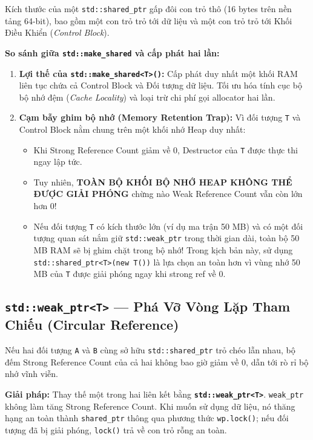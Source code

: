 \documentclass[12pt,a4paper,oneside]{book}
\begin{document}
\begin{underhoodbox}
Kích thước của một \texttt{std::shared\_ptr} gấp đôi con trỏ thô (16 bytes trên nền tảng 64-bit), bao gồm một con trỏ trỏ tới dữ liệu và một con trỏ trỏ tới Khối Điều Khiển (\textit{Control Block}).

\textbf{So sánh giữa \texttt{std::make\_shared} và cấp phát hai lần:}
\begin{enumerate}
    \item \textbf{Lợi thế của \texttt{std::make\_shared<T>()}:} Cấp phát duy nhất một khối RAM liên tục chứa cả Control Block và Đối tượng dữ liệu. Tối ưu hóa tính cục bộ bộ nhớ đệm (\textit{Cache Locality}) và loại trừ chi phí gọi allocator hai lần.
    \item \textbf{Cạm bẫy ghim bộ nhớ (Memory Retention Trap):} Vì đối tượng \texttt{T} và Control Block nằm chung trên một khối nhớ Heap duy nhất:
    \begin{itemize}
        \item Khi Strong Reference Count giảm về 0, Destructor của \texttt{T} được thực thi ngay lập tức.
        \item Tuy nhiên, \textbf{TOÀN BỘ KHỐI BỘ NHỚ HEAP KHÔNG THỂ ĐƯỢC GIẢI PHÓNG} chừng nào Weak Reference Count vẫn còn lớn hơn 0!
        \item Nếu đối tượng \texttt{T} có kích thước lớn (ví dụ ma trận 50 MB) và có một đối tượng quan sát nắm giữ \texttt{std::weak\_ptr} trong thời gian dài, toàn bộ 50 MB RAM sẽ bị ghim chặt trong bộ nhớ! Trong kịch bản này, sử dụng \texttt{std::shared\_ptr<T>(new T())} là lựa chọn an toàn hơn vì vùng nhớ 50 MB của \texttt{T} được giải phóng ngay khi strong ref về 0.
    \end{itemize}
\end{enumerate}
\end{underhoodbox}

\subsection{\texttt{std::weak\_ptr<T>} --- Phá Vỡ Vòng Lặp Tham Chiếu (Circular Reference)}

Nếu hai đối tượng \texttt{A} và \texttt{B} cùng sở hữu \texttt{std::shared\_ptr} trỏ chéo lẫn nhau, bộ đếm Strong Reference Count của cả hai không bao giờ giảm về 0, dẫn tới rò rỉ bộ nhớ vĩnh viễn.

\textbf{Giải pháp:} Thay thế một trong hai liên kết bằng \textbf{\texttt{std::weak\_ptr<T>}}. \texttt{weak\_ptr} không làm tăng Strong Reference Count. Khi muốn sử dụng dữ liệu, nó thăng hạng an toàn thành \texttt{shared\_ptr} thông qua phương thức \texttt{wp.lock()}; nếu đối tượng đã bị giải phóng, \texttt{lock()} trả về con trỏ rỗng an toàn.
\end{document}
